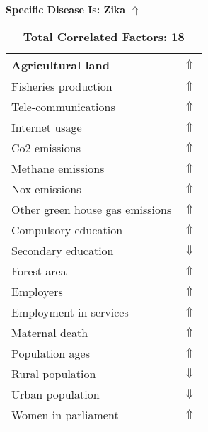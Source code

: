 \documentclass[12pt,notitlepage,oneside]{report}
\begin{document}
\begin{table}[!htb]
\caption{\textbf{Specific Disease Is: Zika $\Uparrow$}}
\centering
\label{Correlated Socio-economic Factors0}
\begin{tabular}{|l|l|}
\hline
Agricultural land & $\Uparrow$\\ \hline
Fisheries production & $\Uparrow$\\ \hline
Tele-communications & $\Uparrow$\\ \hline
Internet usage & $\Uparrow$\\ \hline
Co2 emissions & $\Uparrow$\\ \hline
Methane emissions & $\Uparrow$\\ \hline
Nox emissions & $\Uparrow$\\ \hline
Other green house gas emissions & $\Uparrow$\\ \hline
Compulsory education & $\Uparrow$\\ \hline
Secondary education & $\Downarrow$\\ \hline
Forest area & $\Uparrow$\\ \hline
Employers & $\Uparrow$\\ \hline
Employment in services & $\Uparrow$\\ \hline
Maternal death & $\Uparrow$\\ \hline
Population ages & $\Uparrow$\\ \hline
Rural population & $\Downarrow$\\ \hline
Urban population & $\Downarrow$\\ \hline
Women in parliament & $\Uparrow$\\ \hline
\end{tabular}
\caption*{\textbf{Total Correlated Factors: 18}}
\end{table}
\end{document}
